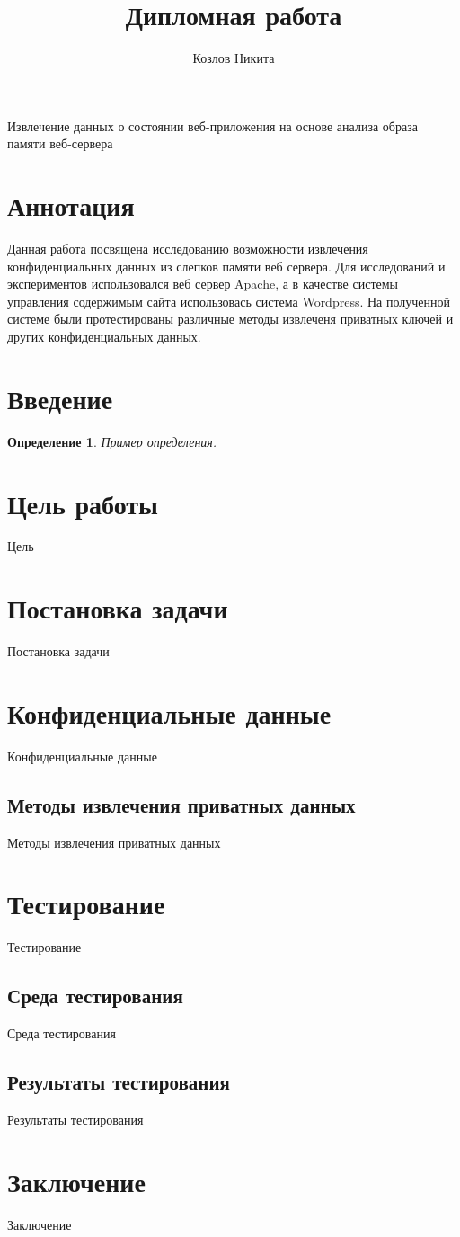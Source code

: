 \documentclass[20pt]{article}
\title{Дипломная работа}
\author{Козлов Никита}
\newtheorem{mydef}{Определение}
\begin{document}
{\huge Извлечение данных о состоянии веб-приложения на основе анализа образа памяти веб-сервера}

\newpage

\section*{Аннотация}

Данная работа посвящена исследованию возможности извлечения конфиденциальных данных из слепков памяти веб сервера. Для исследований и экспериментов использовался веб сервер Apache, а в качестве системы управления содержимым сайта использовась система Wordpress. На полученной системе были протестированы
различные методы извлеченя приватных ключей и других конфиденциальных данных.

\newpage

\tableofcontents
\newpage

\section{Введение}
\begin{mydef}
  Пример определения.
\end{mydef}

\section{Цель работы}
Цель

\section{Постановка задачи}
Постановка задачи

\section{Конфиденциальные данные}
Конфиденциальные данные

\subsection{Методы извлечения приватных данных}
Методы извлечения приватных данных

\section{Тестирование}
Тестирование

\subsection{Среда тестирования}
Среда тестирования

\subsection{Результаты тестирования}
Результаты тестирования

\section{Заключение}
Заключение



\end{document}
